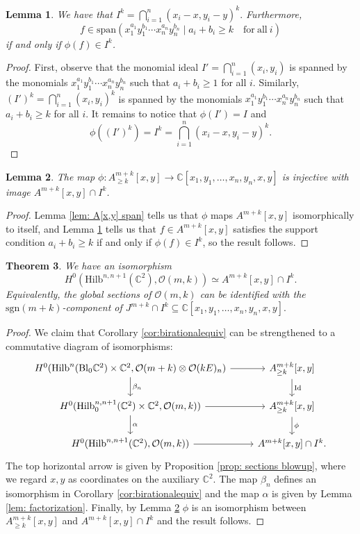 \documentclass[12pt]{amsart}
\newcommand{\Hilb}{\mathrm{Hilb}}
\newcommand{\C}{\mathbb{C}}
\newcommand{\CO}{\mathcal{O}}
\newcommand{\sgn}{\mathrm{sgn}}
\newcommand{\spann}{\mathrm{span}}
\numberwithin{equation}{section}
\newtheorem{theorem}{Theorem}[section]
\newtheorem{lemma}[theorem]{Lemma}
\theoremstyle{definition}
\begin{document}
\begin{lemma}
\label{lem: f in I^k}
We have that
$
I^k=\bigcap_{i=1}^n (x_i-x,y_i-y)^k.
$
Furthermore,
$$f\in \spann\left(x_1^{a_1}y_1^{b_1} \cdots x_n^{a_n}y_n^{b_n}\mid a_i+b_i\ge k\quad \mathrm{for\ all}\ i\right)$$
if and only if $\phi(f)\in I^k$. 
\end{lemma}

\begin{proof}
First, observe that the monomial ideal
$
I'=\bigcap_{i=1}^n(x_i,y_i)  
$
is spanned by the monomials $x_1^{a_1}y_1^{b_1} \cdots x_n^{a_n}y_n^{b_n}$ such that $a_i+b_i\ge 1$ for all $i$. Similarly, 
$
(I')^k=\bigcap_{i=1}^n(x_i,y_i)^k 
$
is spanned by the monomials $x_1^{a_1}y_1^{b_1} \cdots x_n^{a_n}y_n^{b_n}$ such that $a_i+b_i\ge k$ for all $i$. It remains to notice that $\phi(I')=I$ and 
$$
\phi((I')^k)=I^k=\bigcap_{i=1}^n (x_i-x,y_i-y)^k.
$$
\end{proof}

\begin{lemma}\label{lem:changeofvariables}
    The map
    $\phi: A^{m+k}_{\geq k}[x,y] \rightarrow \C[x_1, y_1, \dots, x_n, y_n, x, y]$
    is injective with image $A^{m+k}[x,y] \cap I^k$.
\end{lemma}
\begin{proof}
    Lemma \ref{lem: A[x,y] span} tells us that $\phi$ maps $A^{m+k}[x,y]$ isomorphically to itself, and Lemma \ref{lem: f in I^k} tells us that $f \in A^{m+k}[x,y]$ satisfies the support condition $a_i+b_i\ge k$ if and only if $\phi(f) \in I^k$, so the result follows.
\end{proof}

\begin{theorem}
\label{thm: sections nested}
We have an isomorphism
$$
H^0(\Hilb^{n,n+1}(\C^2),\CO(m,k))\simeq A^{m+k}[x,y] \cap I^k.
$$
Equivalently, the global sections of $\CO(m,k)$ can be identified with  the $\sgn(m+k)$-component of $J^{m+k}\cap I^k\subseteq \C[x_1,y_1,\dots,x_n,y_n,x,y].$
\end{theorem}

\begin{proof}
We claim that Corollary \ref{cor:birationalequiv} can be strengthened to a commutative diagram of isomorphisms:
$$
\begin{tikzcd}
 H^0(\Hilb^n (\mathrm{Bl}_0 \C^2)\times \C^2,\CO(m+k)\otimes \CO(kE)_n) \arrow{r} \arrow{d}{\beta_n} &  A^{m+k}_{\ge k}[x,y] \arrow{d}{\mathrm{Id}}\\
 H^0(\Hilb^{n,n+1}_0(\C^2)\times \C^2,\CO(m,k)) \arrow{r} \arrow{d}{\alpha} & A^{m+k}_{\ge k}[x,y] \arrow{d}{\phi} \\
  H^0(\Hilb^{n,n+1}(\C^2),\CO(m,k))
  \arrow{r}
  & A^{m+k}[x,y]\cap I^k.
\end{tikzcd}
$$
The top horizontal arrow is given by Proposition \ref{prop: sections blowup}, where we regard $x,y$ as coordinates on the auxiliary $\C^2$. The map $\beta_n$ defines an isomorphism in Corollary \ref{cor:birationalequiv} and the map $\alpha$ is given by Lemma \ref{lem: factorization}. Finally, by Lemma \ref{lem:changeofvariables} $\phi$ is an isomorphism between $A^{m+k}_{\ge k}[x,y]$ and $A^{m+k}[x,y]\cap I^k$ and the result follows.
\end{proof}
\end{document}
